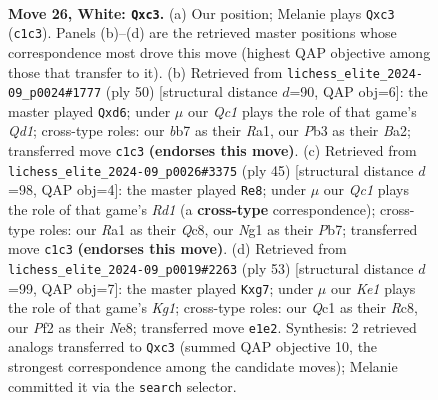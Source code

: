 \documentclass[11pt]{article}
\begin{document}
\begin{figure}[p]
\label{fig:thought-m48}
\end{figure}

\clearpage

\begin{figure}[p]\centering
\begin{subfigure}{0.46\textwidth}\centering
\resizebox{\linewidth}{!}{%
\newchessgame
\chessboard[
  setfen={2r4k/1b1n1p1p/5rp1/pp1Pp3/4P3/1Pq3P1/5P1P/R1Q1K1NR w - - 0 26},
  showmover=false,
  pgfstyle=straightmove, color=movearrow, markmove={c1-c3}
]}
\caption{}
\end{subfigure}\hfill
\begin{subfigure}{0.46\textwidth}\centering
\resizebox{\linewidth}{!}{%
\newchessgame
\chessboard[
  setfen={r2rR3/pp3ppk/3q2p1/P5Pn/2p2P2/2P5/B6P/R2Q2K1 w - - 2 26},
  showmover=false,
  pgfstyle=straightmove, color=movearrow, markmove={d1-d6}
]}
\caption{}
\end{subfigure}
\\[4pt]
\begin{subfigure}{0.46\textwidth}\centering
\resizebox{\linewidth}{!}{%
\newchessgame
\chessboard[
  setfen={r1qr2k1/1p3p1p/pB3p2/P3p2Q/3nPP2/8/1P4PP/R4RK1 b - - 4 23},
  showmover=false,
  pgfstyle=straightmove, color=movearrow, markmove={d8-e8}
]}
\caption{}
\end{subfigure}\hfill
\begin{subfigure}{0.46\textwidth}\centering
\resizebox{\linewidth}{!}{%
\newchessgame
\chessboard[
  setfen={2r1n1k1/3q1pB1/pQ4p1/P1pP3p/2r4P/2N5/RP3PP1/4R1K1 b - - 0 27},
  showmover=false,
  pgfstyle=straightmove, color=movearrow, markmove={g8-g7}
]}
\caption{}
\end{subfigure}
\caption{\textbf{Move 26, White: \texttt{Qxc3}.} (a) Our position; Melanie plays \texttt{Qxc3} (\texttt{c1c3}). Panels (b)--(d) are the retrieved master positions whose correspondence most drove this move (highest QAP objective among those that transfer to it). (b) Retrieved from \texttt{lichess\_elite\_2024-09\_p0024\#1777} (ply 50) [structural distance $d$=90, QAP obj=6]: the master played \texttt{Qxd6}; under $\mu$ our \emph{Qc1} plays the role of that game's \emph{Qd1}; cross-type roles: our \emph{b}b7 as their \emph{R}a1, our \emph{P}b3 as their \emph{B}a2; transferred move \texttt{c1c3} \textbf{(endorses this move)}. (c) Retrieved from \texttt{lichess\_elite\_2024-09\_p0026\#3375} (ply 45) [structural distance $d$=98, QAP obj=4]: the master played \texttt{Re8}; under $\mu$ our \emph{Qc1} plays the role of that game's \emph{Rd1} (a \textbf{cross-type} correspondence); cross-type roles: our \emph{R}a1 as their \emph{Q}c8, our \emph{N}g1 as their \emph{P}b7; transferred move \texttt{c1c3} \textbf{(endorses this move)}. (d) Retrieved from \texttt{lichess\_elite\_2024-09\_p0019\#2263} (ply 53) [structural distance $d$=99, QAP obj=7]: the master played \texttt{Kxg7}; under $\mu$ our \emph{Ke1} plays the role of that game's \emph{Kg1}; cross-type roles: our \emph{Q}c1 as their \emph{R}c8, our \emph{P}f2 as their \emph{N}e8; transferred move \texttt{e1e2}. Synthesis: 2 retrieved analogs transferred to \texttt{Qxc3} (summed QAP objective 10, the strongest correspondence among the candidate moves); Melanie committed it via the \texttt{search} selector.}

\end{figure}
\end{document}
